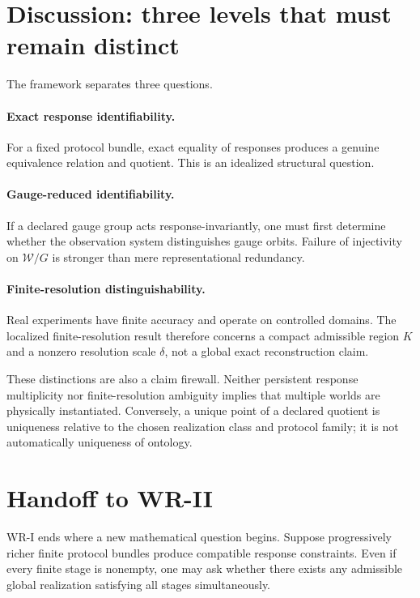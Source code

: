 \documentclass[11pt]{article}
\newcommand{\W}{\mathcal W}
\begin{document}
\section{Discussion: three levels that must remain distinct}

The framework separates three questions.

\paragraph{Exact response identifiability.}
For a fixed protocol bundle, exact equality of responses produces a genuine
equivalence relation and quotient. This is an idealized structural question.

\paragraph{Gauge-reduced identifiability.}
If a declared gauge group acts response-invariantly, one must first determine
whether the observation system distinguishes gauge orbits. Failure of
injectivity on $\W/G$ is stronger than mere representational redundancy.

\paragraph{Finite-resolution distinguishability.}
Real experiments have finite accuracy and operate on controlled domains. The
localized finite-resolution result therefore concerns a compact admissible
region $K$ and a nonzero resolution scale $\delta$, not a global exact
reconstruction claim.

These distinctions are also a claim firewall. Neither persistent response
multiplicity nor finite-resolution ambiguity implies that multiple worlds are
physically instantiated. Conversely, a unique point of a declared quotient is
uniqueness relative to the chosen realization class and protocol family; it is
not automatically uniqueness of ontology.

\section{Handoff to WR-II}

WR-I ends where a new mathematical question begins. Suppose progressively richer
finite protocol bundles produce compatible response constraints. Even if every
finite stage is nonempty, one may ask whether there exists any admissible global
realization satisfying all stages simultaneously.
\end{document}

